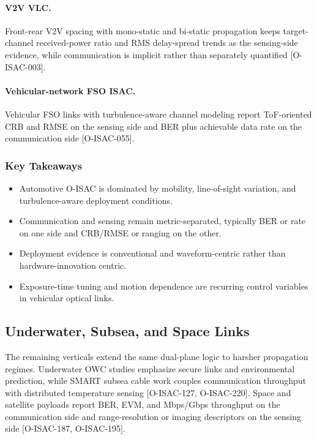 \paragraph{V2V VLC.}
Front-rear V2V spacing with mono-static and bi-static propagation keeps target-channel received-power ratio and RMS delay-spread trends as the sensing-side evidence, while communication is implicit rather than separately quantified [O-ISAC-003].

\paragraph{Vehicular-network FSO ISAC.}
Vehicular FSO links with turbulence-aware channel modeling report ToF-oriented CRB and RMSE on the sensing side and BER plus achievable data rate on the communication side [O-ISAC-055].

\subsubsection{Key Takeaways}
\begin{itemize}
\item Automotive O-ISAC is dominated by mobility, line-of-sight variation, and turbulence-aware deployment conditions.
\item Communication and sensing remain metric-separated, typically BER or rate on one side and CRB/RMSE or ranging on the other.
\item Deployment evidence is conventional and waveform-centric rather than hardware-innovation centric.
\item Exposure-time tuning and motion dependence are recurring control variables in vehicular optical links.
\end{itemize}

\subsection{Underwater, Subsea, and Space Links}
\label{subsec:apps-underwater-space}

The remaining verticals extend the same dual-plane logic to harsher propagation regimes. Underwater OWC studies emphasize secure links and environmental prediction, while SMART subsea cable work couples communication throughput with distributed temperature sensing [O-ISAC-127, O-ISAC-220]. Space and satellite payloads report BER, EVM, and Mbps/Gbps throughput on the communication side and range-resolution or imaging descriptors on the sensing side [O-ISAC-187, O-ISAC-195].

